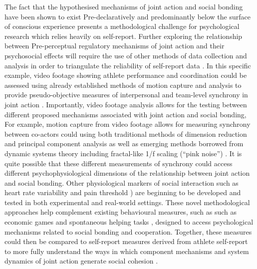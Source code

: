 \begin{CJK}{UTF8}{gbsn}
  The fact that the hypothesised mechanisms of joint action and social bonding have been shown to exist Pre-declaratively and predominantly below the surface of conscious experience presents a methodological challenge for psychological research which relies heavily on self-report.  Further exploring the relationship between Pre-perceptual regulatory mechanisms of joint action and their psychosocial effects will require the use of other methods of data collection and analysis in order to triangulate the reliability of self-report data \citep{Newell2014}.  In this specific example, video footage showing athlete performance and coordination could be assessed using already established methods of motion capture and analysis to provide pseudo-objective measures of interpersonal and team-level synchrony in joint action \citep[e.g.][]{Passos2011}.
  Importantly, video footage analysis allows for the testing between different proposed mechanisms associated with joint action and social bonding,  For example, motion capture from video footage allows for measuring synchrony between co-actors could using both traditional methods of dimension reduction and principal component analysis \citep[see for example][]{Riley2011} as well as emerging methods borrowed from dynamic systems theory including fractal-like 1/f scaling (``pink noise'') \citep[see for example][]{Holden2013}. It is quite possible that these different measurements of synchrony could access different psychophysiological dimensions of the relationship between joint action and social bonding.  Other physiological markers of social interaction such as heart rate variability \citep{Konvalinka2011,Fischer2014a} and pain threshold \citep{Cohen2009,Tarr2015}) are beginning to be developed and tested in both experimental and real-world settings.
  These novel methodological approaches help complement existing behavioural measures, such as such as economic games \citep{Xygalatas2013} and spontaneous helping tasks \citep{Kirschner2010}, designed to access psychological mechanisms related to social bonding and cooperation.
  Together, these measures could then be compared to self-report measures derived from athlete self-report to more fully understand the ways in which component mechanisms and system dynamics of joint action generate social cohesion \citep{Marsh2009}.


\end{CJK}
